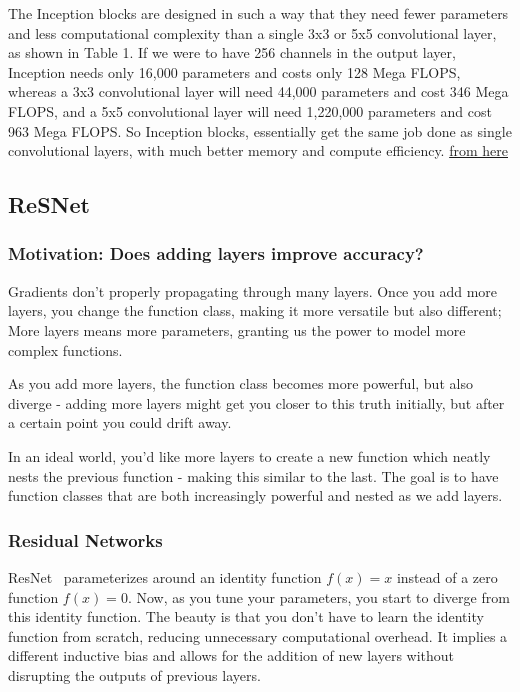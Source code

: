 \documentclass[11pt]{article}
\begin{document}
The Inception blocks are designed in such a way that they need fewer parameters and less computational complexity than a single 3x3 or 5x5 convolutional layer, as shown in Table 1. If we were to have 256 channels in the output layer, Inception needs only 16,000 parameters and costs only 128 Mega FLOPS, whereas a 3x3 convolutional layer will need 44,000 parameters and cost 346 Mega FLOPS, and a 5x5 convolutional layer will need 1,220,000 parameters and cost 963 Mega FLOPS. So Inception blocks, essentially get the same job done as single convolutional layers, with much better memory and compute efficiency. \href{https://medium.com/swlh/understanding-inception-simplifying-the-network-architecture-54cd31d38949}{from here}

\subsection{ReSNet}

\subsubsection{Motivation: Does adding layers improve accuracy?}

Gradients don't properly propagating through many layers. Once you add more layers, you change the function class, making it more versatile but also different; More layers means more parameters, granting us the power to model more complex functions.

As you add more layers, the function class becomes more powerful, but also diverge - adding more layers might get you closer to this truth initially, but after a certain point you could drift away.

In an ideal world, you'd like more layers to create a new function which neatly nests the previous function - making this similar to the last.  The goal is to have function classes that are both increasingly powerful and nested as we add layers.

\subsubsection{Residual Networks}

ResNet~\cite{ResNet} parameterizes around an identity function $f(x)=x$ instead of a zero function $f(x)=0$. Now, as you tune your parameters, you start to diverge from this identity function. The beauty is that you don't have to learn the identity function from scratch, reducing unnecessary computational overhead. It implies a different inductive bias and allows for the addition of new layers without disrupting the outputs of previous layers.
\end{document}
